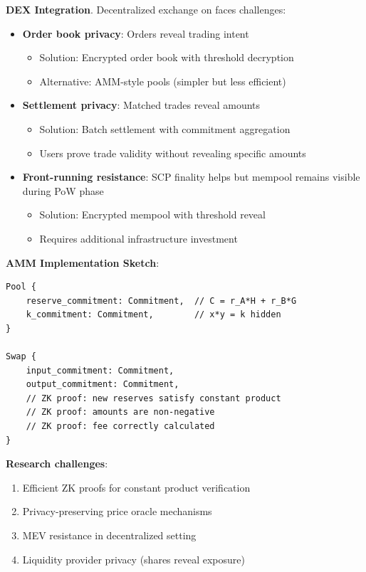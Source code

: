 \textbf{DEX Integration}.
Decentralized exchange on \Botho faces challenges:

\begin{itemize}
  \item \textbf{Order book privacy}: Orders reveal trading intent
    \begin{itemize}
      \item Solution: Encrypted order book with threshold decryption
      \item Alternative: AMM-style pools (simpler but less efficient)
    \end{itemize}
  \item \textbf{Settlement privacy}: Matched trades reveal amounts
    \begin{itemize}
      \item Solution: Batch settlement with commitment aggregation
      \item Users prove trade validity without revealing specific amounts
    \end{itemize}
  \item \textbf{Front-running resistance}: SCP finality helps but mempool
    remains visible during PoW phase
    \begin{itemize}
      \item Solution: Encrypted mempool with threshold reveal
      \item Requires additional infrastructure investment
    \end{itemize}
\end{itemize}

\textbf{AMM Implementation Sketch}:
\begin{lstlisting}[caption={Privacy-preserving AMM concept}]
Pool {
    reserve_commitment: Commitment,  // C = r_A*H + r_B*G
    k_commitment: Commitment,        // x*y = k hidden
}

Swap {
    input_commitment: Commitment,
    output_commitment: Commitment,
    // ZK proof: new reserves satisfy constant product
    // ZK proof: amounts are non-negative
    // ZK proof: fee correctly calculated
}
\end{lstlisting}

\textbf{Research challenges}:
\begin{enumerate}
  \item Efficient ZK proofs for constant product verification
  \item Privacy-preserving price oracle mechanisms
  \item MEV resistance in decentralized setting
  \item Liquidity provider privacy (shares reveal exposure)
\end{enumerate}

